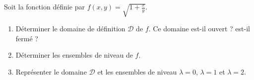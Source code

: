 \documentclass[a4paper]{article}
\begin{document}
 Soit la fonction définie par $f(x,y) =\sqrt{1+\frac{x}{y}}$.
\begin{enumerate}
	\item Déterminer le domaine de définition $\mathcal D$ de $f$. Ce domaine est-il ouvert ? est-il fermé ?
		\vspace{7cm}
\vspace*{4.5cm}
	\item Déterminer les ensembles de niveau de $f$.
\vspace*{9cm}
	\item Représenter le domaine $\mathcal D$ et les ensembles de niveau $\lambda =0$, $\lambda= 1$ et $\lambda = 2$.
		\begin{center}
		\end{center}
\end{enumerate}
\end{document}
